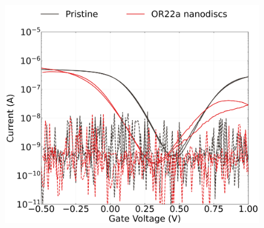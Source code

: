 \documentclass[
  a4paper,
]{scrbook}
\begin{document}
\begin{figure}
\begin{minipage}[t]{0.45\linewidth}
{{\includegraphics{figures/ch7/Q1C6_ch7_absolute_values_with_gate_current.png}

}

}

\end{minipage}%
%
\begin{minipage}[t]{0.01\linewidth}

{\centering 

~

}

\end{minipage}%
%
\begin{minipage}[t]{0.03\linewidth}

{\centering 


}

\end{minipage}%
%
\begin{minipage}[t]{0.01\linewidth}

{\centering 

~

}


\end{minipage}
\end{figure}
\end{document}
